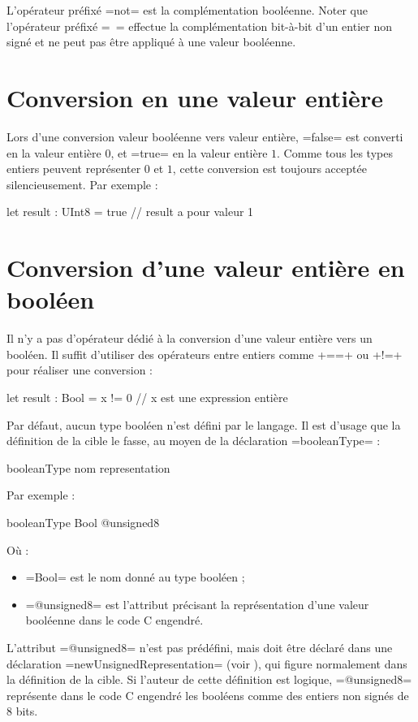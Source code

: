L'opérateur préfixé \plm=not= est la complémentation booléenne. Noter que l'opérateur préfixé \plm=~= effectue la complémentation bit-à-bit d'un entier non signé et ne peut pas être appliqué à une valeur booléenne.

\section{Conversion en une valeur entière}

Lors d'une conversion valeur booléenne vers valeur entière, \plm=false= est converti en la valeur entière $0$, et \plm=true= en la valeur entière $1$. Comme tous les types entiers peuvent représenter $0$ et $1$, cette conversion est toujours acceptée silencieusement. Par exemple :

\begin{PLM}
let result : UInt8 = true // result a pour valeur 1
\end{PLM}


\section{Conversion d'une valeur entière en booléen}

Il n'y a pas d'opérateur dédié à la conversion d'une valeur entière vers un booléen. Il suffit d'utiliser des opérateurs entre entiers comme \plm+==+ ou \plm+!=+ pour réaliser une conversion :

\begin{PLM}
let result : Bool = x != 0 // x est une expression entière
\end{PLM}



Par défaut, aucun type booléen n'est défini par le langage. Il est d'usage que la définition de la cible le fasse, au moyen de la déclaration \plm=booleanType= :

\begin{PLM}
booleanType nom representation
\end{PLM}

Par exemple :
\begin{PLM}
booleanType Bool @unsigned8
\end{PLM}

Où :
\begin{itemize}
  \item \plm=Bool= est le nom donné au type booléen ;
  \item \plm=@unsigned8= est l'attribut précisant la représentation d'une valeur booléenne dans le code C engendré.
\end{itemize}

L'attribut \plm=@unsigned8= n'est pas prédéfini, mais doit être déclaré dans une déclaration \plm=newUnsignedRepresentation= (voir ), qui figure normalement dans la définition de la cible. Si l'auteur de cette définition est logique, \plm=@unsigned8= représente dans le code C engendré les booléens comme des entiers non signés de 8 bits.

